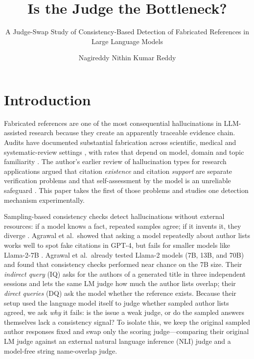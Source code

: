 \documentclass[acmsmall,screen]{acmart}
\title{Is the Judge the Bottleneck?}
\subtitle{A Judge-Swap Study of Consistency-Based Detection of Fabricated References in Large Language Models}
\author{Nagireddy Nithin Kumar Reddy}
\affiliation{%
  \institution{Indian Institute of Information Technology Allahabad}
  \department{M.Tech Information Technology with Specialization in AI/ML; Roll No.: MAI2026010}
  \city{Prayagraj}
  \country{India}}
\begin{document}
\maketitle

\section{Introduction}\label{sec:intro}
Fabricated references are one of the most consequential hallucinations in LLM-assisted research because they create an apparently traceable evidence chain. Audits have documented substantial fabrication across scientific, medical and systematic-review settings \cite{walters2023fabrication,athaluri2023exploring,bhattacharyya2023high,chelli2024hallucination}, with rates that depend on model, domain and topic familiarity \cite{linardon2025topic}. The author's earlier review of hallucination types for research applications \cite{reddy2026taxonomy} argued that citation \emph{existence} and citation \emph{support} are separate verification problems and that self-assessment by the model is an unreliable safeguard \cite{dahl2024large}. This paper takes the first of those problems and studies one detection mechanism experimentally.

Sampling-based consistency checks detect hallucinations without external resources: if a model knows a fact, repeated samples agree; if it invents it, they diverge \cite{manakul2023selfcheck}. Agrawal et al.\ showed that asking a model repeatedly about author lists works well to spot fake citations in GPT-4, but fails for smaller models like Llama-2-7B \cite{agrawal2023hallucinating}. Agrawal et al.\ already tested Llama-2 models (7B, 13B, and 70B) and found that consistency checks performed near chance on the 7B size. Their \emph{indirect query} (IQ) asks for the authors of a generated title in three independent sessions and lets the same LM judge how much the author lists overlap; their \emph{direct queries} (DQ) ask the model whether the reference exists. Because their setup used the language model itself to judge whether sampled author lists agreed, we ask \emph{why} it fails: is the issue a weak judge, or do the sampled answers themselves lack a consistency signal? To isolate this, we keep the original sampled author responses fixed and swap only the scoring judge—comparing their original LM judge against an external natural language inference (NLI) judge and a model-free string name-overlap judge.
\end{document}
